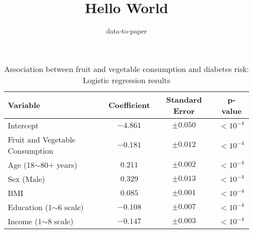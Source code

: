 \documentclass[12pt]{article}
\title{Hello World}
\author{data-to-paper}
\begin{document}
\maketitle

\begin{table}[!htbp]
\centering
\caption{Association between fruit and vegetable consumption and diabetes risk: Logistic regression results}
\label{table2}
\begin{tabular}{l c c c}
\toprule
\textbf{Variable}                & \textbf{Coefficient} & \textbf{Standard Error} & \textbf{p-value} \\
\midrule
Intercept                        & $-4.861$             & $\pm 0.050$             & $<10^{-4}$       \\
Fruit and Vegetable Consumption & $-0.181$             & $\pm 0.012$             & $<10^{-4}$       \\
Age (18$\sim$80+ years)          & $0.211$              & $\pm 0.002$             & $<10^{-4}$       \\
Sex (Male)                       & $0.329$              & $\pm 0.013$             & $<10^{-4}$       \\
BMI                              & $0.085$              & $\pm 0.001$             & $<10^{-4}$       \\
Education (1$\sim$6 scale)       & $-0.108$             & $\pm 0.007$             & $<10^{-4}$       \\
Income (1$\sim$8 scale)          & $-0.147$             & $\pm 0.003$             & $<10^{-4}$       \\
\bottomrule
\end{tabular}
\end{table}
\end{document}

